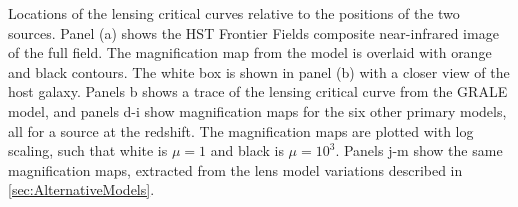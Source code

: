 \label{fig:SpockCriticalCurves}
Locations of the lensing critical curves relative to the positions of
the two \spock sources. Panel (a) shows the HST Frontier Fields
composite near-infrared image of the full  field.  The
magnification map from the \citet{Caminha:2017} model is overlaid with
orange and black contours.  The white box is shown in panel (b) with a
closer view of the \spock host galaxy.  Panels b shows a trace of the
lensing critical curve from the GRALE model, and panels d-i show
magnification maps for the six other primary models, all for a source
at the \spock redshift.  The magnification maps are plotted with log
scaling, such that white is $\mu=1$ and black is $\mu=10^3$.  Panels
j-m show the same magnification maps, extracted from the lens model
variations described in \ref{sec:AlternativeModels}. 
